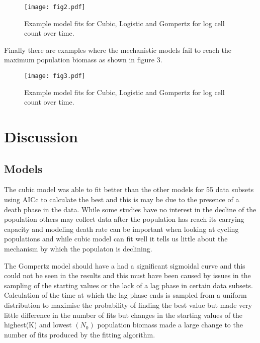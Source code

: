 \documentclass[11pt]{article}
\begin{document}
\begin{figure}[hbt!]
\texttt{[image: fig2.pdf]}
\centering
\caption{Example model fits for Cubic, Logistic and Gompertz for log cell count over time.}
\end{figure}

Finally there are examples where the mechanistic models fail to reach the maximum population biomass as shown in figure 3.

\begin{figure}[hbt!]
\texttt{[image: fig3.pdf]}
\centering
\caption{Example model fits for Cubic, Logistic and Gompertz for log cell count over time.}
\end{figure}
\pagebreak
\section{Discussion}

\subsection{Models}

The cubic model was able to fit better than the other models for 55 data subsets using AICc to calculate the best and this is may be due to the presence of a death phase in the data. While some studies have no interest in the decline of the population others may collect data after the population has reach its carrying capacity and modeling death rate can be important when looking at cycling populations\cite{Kendall1999WHYAPPROACHES} and while cubic model can fit well it tells us little about the mechanism by which the populaton is declining.

The Gompertz model should have a had a significant sigmoidal curve and this could not be seen in the results and this must have been caused by issues in the sampling of the starting values or the lack of a lag phase in certain data subsets. Calculation of the time at which the lag phase ends is sampled from a uniform distribution to maximise the probability of finding the best value but made very little difference in the number of fits but changes in the starting values of the highest(K) and lowest $(N_0)$ population biomass made a large change to the number of fits produced by the fitting algorithm. 
\end{document}
